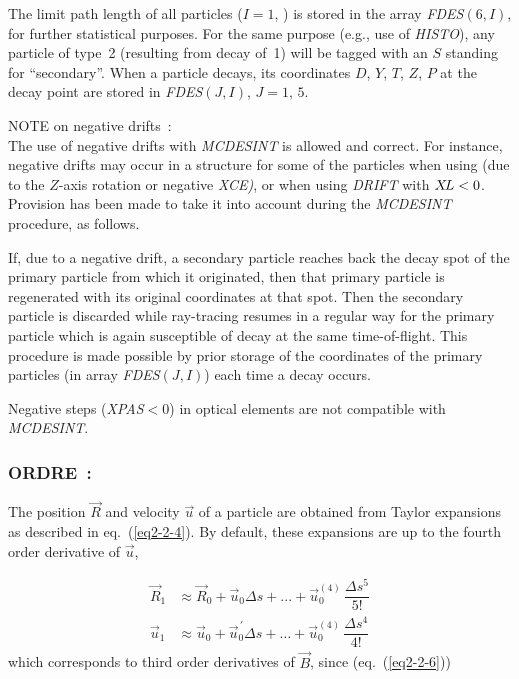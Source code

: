 \noindent The limit path length of all particles  ($I=1$, \IMAX{})   is stored in
the array  \textsl{FDES}$(6,I)$, for further statistical purposes. For the same purpose 
(e.g., use of \textsl{HISTO}), any particle of type~2 (resulting from decay of~1) 
will be tagged with an $ S $ standing for ``secondary''. When a particle decays, 
its coordinates $ D$, $Y$, $T$, $Z$, $P $ at the decay point are stored in  
\textsl{FDES}$(J,I)$, \mbox{$ J=1,\, 5$}.  
\bigskip

\noindent  NOTE on negative drifts~: \\
The use  of  negative  drifts  with  \textsl{MCDESINT}  is  allowed 
and correct. 
For instance,  negative drifts  may  occur  in  a  structure   for 
some  of  the  particles  when  using  \CHANGREF{} (due to  the  $ Z$-axis 
rotation  or  negative  \textsl{XCE)},  or  when  using  \textsl{DRIFT}  with 
$X\!L<0$. 
Provision  has  been  made  to  take  it  into  account during  the \textsl{MCDESINT}
 procedure,  as follows. 

\noindent If, due   to  a  negative  drift,   a  secondary  particle  reaches 
back the  decay spot of the  primary  particle  from which it originated, then 
that  primary  particle  is  regenerated  with its original coordinates 
at  that  spot. Then   the   secondary   particle   is   discarded   while 
ray-tracing  resumes  in  a  regular way  for the primary  particle which  
is again susceptible of decay  at  the  same  time-of-flight. This  procedure  is made 
possible  by  prior storage  of  the  coordinates of the primary 
particles (in array \textsl{FDES}$(J,I)$) each  time  a  decay  occurs. 

\noindent Negative steps (\textsl{XPAS}$<0$) in
optical elements are not compatible with  \textsl{MCDESINT}.  
 \newpage

\subsubsection*{ORDRE~: \ORDRETitl } \label{ORDRE} 
\medskip

 The position $ \vec  R $ and velocity $ \vec  u $ of a particle are
obtained from Taylor expansions as described in eq.~(\ref{eq2-2-4}). By default, these 
expansions are up to the fourth order derivative of $ \vec  u$, 

\begin{align*}
	\vec  R_1 
	     & \approx  \vec  R_0 + \vec  u_0 \Delta s +...+ \vec u^{(4)}_0 \, \dfrac{\Delta s^5 }{ 5!} \\
	\vec  u_1 
	     & \approx  \vec  u_0 + \vec  u^{\,\prime}_0 \Delta s  
	        + \ldots + \vec  u^{(4)}_0\, \dfrac{\Delta s^4 }{ 4!}   
\end{align*}
%
 which corresponds to third order derivatives of $ \vec  B $, since (eq.~(\ref{eq2-2-6}))
 
